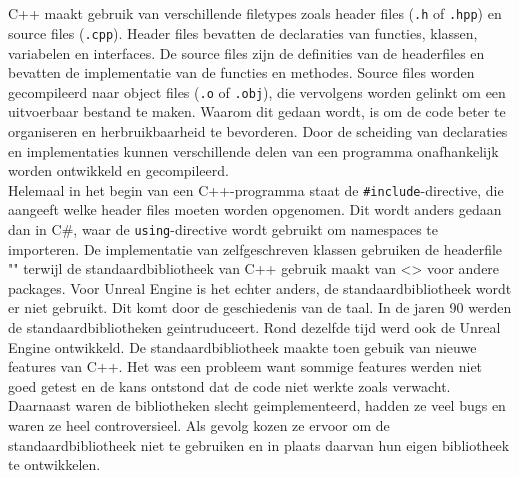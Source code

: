 \chapter{}%
\label{ch:stand-van-zaken}




C++ maakt gebruik van verschillende filetypes zoals header files (\texttt{.h} of \texttt{.hpp}) en source files (\texttt{.cpp}).
Header files bevatten de declaraties van functies, klassen, variabelen en interfaces. De source files zijn de definities van de headerfiles en bevatten de implementatie van de functies en methodes.
Source files worden gecompileerd naar object files (\texttt{.o} of \texttt{.obj}), die vervolgens worden gelinkt om een uitvoerbaar bestand te maken.
Waarom dit gedaan wordt, is om de code beter te organiseren en herbruikbaarheid te bevorderen. Door de scheiding van declaraties en implementaties kunnen verschillende delen van een programma onafhankelijk worden ontwikkeld en gecompileerd.
\\

Helemaal in het begin van een C++-programma staat de \texttt{\#include}-directive, die aangeeft welke header files moeten worden opgenomen.
Dit wordt anders gedaan dan in C\#, waar de \texttt{using}-directive wordt gebruikt om namespaces te importeren.
De implementatie van zelfgeschreven klassen gebruiken de headerfile "" terwijl de standaardbibliotheek van C++ gebruik maakt van <> voor andere packages.
Voor Unreal Engine is het echter anders, de standaardbibliotheek wordt er niet gebruikt.
Dit komt door de geschiedenis van de taal. In de jaren 90 werden de standaardbibliotheken geintruduceert.
Rond dezelfde tijd werd ook de Unreal Engine ontwikkeld. 
De standaardbibliotheek maakte toen gebuik van nieuwe features van C++. 
Het was een probleem want sommige features werden niet goed getest en de kans ontstond dat de code niet werkte zoals verwacht.
Daarnaast waren de bibliotheken slecht geimplementeerd, hadden ze veel bugs en waren ze heel controversieel.
Als gevolg kozen ze ervoor om de standaardbibliotheek niet te gebruiken en in plaats daarvan hun eigen bibliotheek te ontwikkelen.

